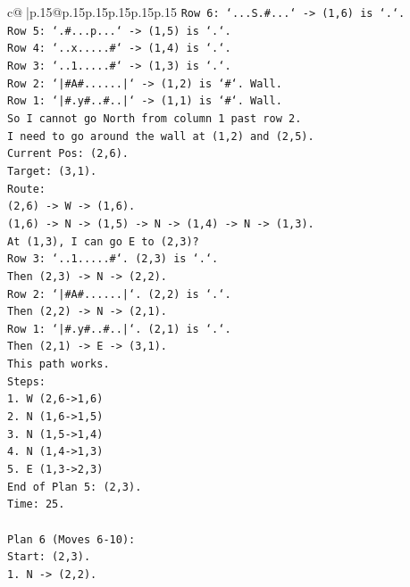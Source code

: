 \documentclass{article}
\begin{document}
{\begin{supertabular}{c@{$\;$}|p{.15\linewidth}@{}p{.15\linewidth}p{.15\linewidth}p{.15\linewidth}p{.15\linewidth}p{.15\linewidth}}
{{{\texttt{Row 6: `...S.\#...` {-}> (1,6) is `.`.} \\
\texttt{Row 5: `.\#...p...` {-}> (1,5) is `.`.} \\
\texttt{Row 4: `..x.....\#` {-}> (1,4) is `.`.} \\
\texttt{Row 3: `..1.....\#` {-}> (1,3) is `.`.} \\
\texttt{Row 2: `|\#A\#......|` {-}> (1,2) is `\#`. Wall.} \\
\texttt{Row 1: `|\#.y\#..\#..|` {-}> (1,1) is `\#`. Wall.} \\
\texttt{So I cannot go North from column 1 past row 2.} \\
\texttt{I need to go around the wall at (1,2) and (2,5).} \\
\texttt{Current Pos: (2,6).} \\
\texttt{Target: (3,1).} \\
\texttt{Route:} \\
\texttt{(2,6) {-}> W {-}> (1,6).} \\
\texttt{(1,6) {-}> N {-}> (1,5) {-}> N {-}> (1,4) {-}> N {-}> (1,3).} \\
\texttt{At (1,3), I can go E to (2,3)?} \\
\texttt{Row 3: `..1.....\#`. (2,3) is `.`.} \\
\texttt{Then (2,3) {-}> N {-}> (2,2).} \\
\texttt{Row 2: `|\#A\#......|`. (2,2) is `.`.} \\
\texttt{Then (2,2) {-}> N {-}> (2,1).} \\
\texttt{Row 1: `|\#.y\#..\#..|`. (2,1) is `.`.} \\
\texttt{Then (2,1) {-}> E {-}> (3,1).} \\
\texttt{This path works.} \\
\texttt{Steps:} \\
\texttt{1. W (2,6{-}>1,6)} \\
\texttt{2. N (1,6{-}>1,5)} \\
\texttt{3. N (1,5{-}>1,4)} \\
\texttt{4. N (1,4{-}>1,3)} \\
\texttt{5. E (1,3{-}>2,3)} \\
\texttt{End of Plan 5: (2,3).} \\
\texttt{Time: 25.} \\
\\ 
\texttt{Plan 6 (Moves 6{-}10):} \\
\texttt{Start: (2,3).} \\
\texttt{1. N {-}> (2,2).} \\
}}}
\end{supertabular}}
\end{document}

